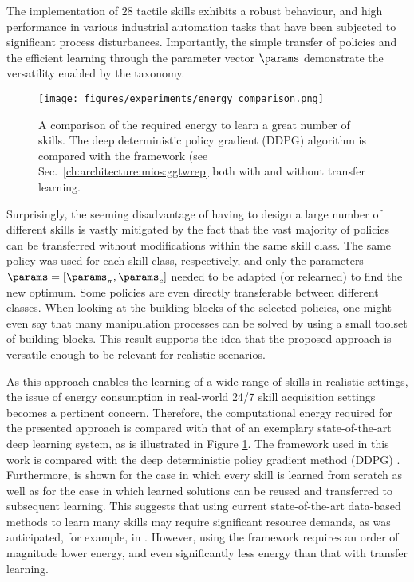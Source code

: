 The implementation of $28$ tactile skills exhibits a robust behaviour, and high performance in various industrial automation tasks that have been subjected to significant process disturbances.
Importantly, the simple transfer of policies and the efficient learning through the parameter vector $\params$ demonstrate the versatility enabled by the taxonomy.

\begin{figure}
    \centering
    \texttt{[image: figures/experiments/energy\_comparison.png]}
    \caption{A comparison of the required energy to learn a great number of skills. The deep deterministic policy gradient (DDPG) algorithm is compared with the \skillmodelabbr{} framework (see Sec.~\ref{ch:architecture:mios:ggtwrep} both with and without transfer learning.}
    \label{fig:experiments:taxonomy:comparison}
\end{figure}

Surprisingly, the seeming disadvantage of having to design a large number of different skills is vastly mitigated by the fact that the vast majority of policies can be transferred without modifications within the same skill class.
The same policy was used for each skill class, respectively, and only the parameters $\params=\left[\params_\pi,\params_c\right]$ needed to be adapted (or relearned) to find the new optimum.
Some policies are even directly transferable between different classes.
When looking at the building blocks of the selected policies, one might even say that many manipulation processes can be solved by using a small toolset of building blocks.
This result supports the idea that the proposed approach is versatile enough to be relevant for realistic scenarios.

As this approach enables the learning of a wide range of skills in realistic settings, the issue of energy consumption in real-world 24/7 skill acquisition settings becomes a pertinent concern.
Therefore, the computational energy required for the presented approach is compared with that of an exemplary state-of-the-art deep learning system, as is illustrated in Figure \ref{fig:experiments:taxonomy:comparison}.
The \skillmodelabbr{} framework used in this work is compared with the deep deterministic policy gradient method (DDPG) \cite{lillicrap2015continuous}.
Furthermore, \skillmodelabbr{} is shown for the case in which every skill is learned from scratch as well as for the case in which learned solutions can be reused and transferred to subsequent learning.
This suggests that using current state-of-the-art data-based methods to learn many skills may require significant resource demands, as was anticipated, for example, in \cite{thompson2020computational}. However, using the \skillmodelabbr{} framework requires an order of magnitude lower energy, and even significantly less energy than that with transfer learning.

